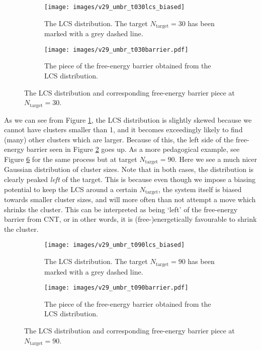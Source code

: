 \documentclass[thesis]{subfiles}
\begin{document}
\begin{figure}[h]
	\centering
	\begin{subfigure}[t]{0.45\textwidth}
		\centering
		\texttt{[image: images/v29\_umbr\_t030lcs\_biased]}
		\caption{The LCS distribution. The target $N_\textrm{target} = 30$ has been marked with a grey dashed line.}
		\label{fig:step1distr}
	\end{subfigure}\hfill
	\begin{subfigure}[t]{0.45\textwidth}
		\centering
		\texttt{[image: images/v29\_umbr\_t030barrier.pdf]}
		\caption{The piece of the free-energy barrier obtained from the LCS distribution.}
		\label{fig:step1bar}
	\end{subfigure}
	\caption{The LCS distribution and corresponding free-energy barrier piece at $N_\textrm{target} = 30$.}
	\label{fig:step1}
\end{figure}

As we can see from Figure \ref{fig:step1distr}, the LCS distribution is slightly skewed because we cannot have clusters smaller than 1, and it becomes exceedingly likely to find (many) other clusters which are larger. Because of this, the left side of the free-energy barrier seen in Figure \ref{fig:step1bar} goes up. As a more pedagogical example, see Figure \ref{fig:step2} for the same process but at target $N_\textrm{target} = 90$. Here we see a much nicer Gaussian distribution of cluster sizes. Note that in both cases, the distribution is clearly peaked \emph{left} of the target. This is because even though we impose a biasing potential to keep the LCS around a certain $N_\textrm{target}$, the system itself is biased towards smaller cluster sizes, and will more often than not attempt a move which shrinks the cluster. This can be interpreted as being `left' of the free-energy barrier from CNT, or in other words, it is (free-)energetically favourable to shrink the cluster.

\begin{figure}[h]
	\centering
	\begin{subfigure}[t]{0.45\textwidth}
		\centering
		\texttt{[image: images/v29\_umbr\_t090lcs\_biased]}
		\caption{The LCS distribution. The target $N_\textrm{target} = 90$ has been marked with a grey dashed line.}
		\label{fig:step2distr}
	\end{subfigure}\hfill
	\begin{subfigure}[t]{0.45\textwidth}
		\centering
		\texttt{[image: images/v29\_umbr\_t090barrier.pdf]}
		\caption{The piece of the free-energy barrier obtained from the LCS distribution.}
		\label{fig:step2bar}
	\end{subfigure}
	\caption{The LCS distribution and corresponding free-energy barrier piece at $N_\textrm{target} = 90$.}
	\label{fig:step2}
\end{figure}
\end{document}
